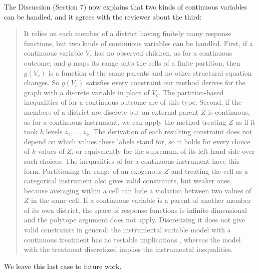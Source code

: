 \documentclass{article}
\begin{document}
\begin{enumerate}
    \begin{mdframed}
        The Discussion (Section 7) now explains that two kinds of continuous variables can be handled, and it agrees with the reviewer about the third:
        \begin{quote}
        It relies on each member of a district having finitely many response functions, but two kinds of continuous variables can be handled. First, if a continuous variable $V_c$ has no observed children, as for a continuous outcome, and $g$ maps its range onto the cells of a finite partition, then $g(V_c)$ is a function of the same parents and no other structural equation changes. So $g(V_c)$ satisfies every constraint our method derives for the graph with a discrete variable in place of $V_c$. The partition-based inequalities of \citet{kedagni2020generalized} for a continuous outcome are of this type. Second, if the members of a district are discrete but an external parent $Z$ is continuous, as for a continuous instrument, we can apply the method treating $Z$ as if it took $k$ levels $z_1, \ldots, z_k$. The derivation of each resulting constraint does not depend on which values these labels stand for, so it holds for every choice of $k$ values of $Z$, or equivalently for the supremum of its left-hand side over such choices. The inequalities of \citet{kedagni2020generalized} for a continuous instrument have this form. Partitioning the range of an exogenous $Z$ and treating the cell as a categorical instrument also gives valid constraints, but weaker ones, because averaging within a cell can hide a violation between two values of $Z$ in the same cell. If a continuous variable is a parent of another member of its own district, the space of response functions is infinite-dimensional and the polytope argument does not apply. Discretizing it does not give valid constraints in general: the instrumental variable model with a continuous treatment has no testable implications \citep{gunsilius2021nontestability}, whereas the model with the treatment discretized implies the instrumental inequalities.
        \end{quote}
        We leave this last case to future work.
    \end{mdframed}
\end{enumerate}




\end{document}
